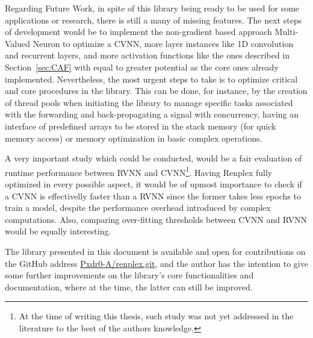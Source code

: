 Regarding Future Work, in spite of this library being ready to be used for some applications or research, there is still a many of missing features. The next steps of development would be to implement the non-gradient based approach Multi-Valued Neuron to optimize a CVNN, more layer instances like 1D convolution and recurrent layers, and more activation functions like the ones described in Section~\ref{sec:CAF} with equal to greater potential as the core ones already implemented. Nevertheless, the most urgent steps to take is to optimize critical and core procedures in the library. This can be done, for instance, by the creation of thread pools when initiating the library to manage specific tasks associated with the forwarding and back-propagating a signal with concurrency, having an interface of predefined arrays to be stored in the stack memory (for quick memory access) or memory optimization in basic complex operations.

A very important study which could be conducted, would be a fair evaluation of runtime performance between RVNN and CVNN\footnote{At the time of writing this thesis, such study was not yet addressed in the literature to the best of the authors knowledge.}. Having Renplex fully optimized in every possible aspect, it would be of upmost importance to check if a CVNN is effectivelly faster than a RVNN since the former takes less epochs to train a model, despite the performance overhead introduced by complex computations. Also, comparing over-fitting thresholds between CVNN and RVNN would be equally interesting.

The library presented in this document is available and open for contributions on the GitHub address \href{https://github.com/Pxdr0-A/renplex.git}{Pxdr0-A/renplex.git}, and the author has the intention to give some further improvements on the library's core functionalities and documentation, where at the time, the latter can still be improved.

